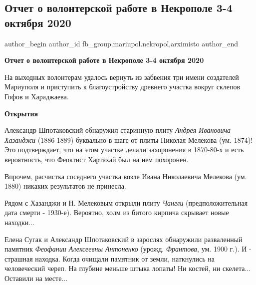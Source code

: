  
 
 
 
 

\subsection{Отчет о волонтерской работе в Некрополе 3-4 октября 2020}
\label{sec:06_10_2020.fb.fb_group.mariupol.nekropol.1.otchet_volonter_rabota_3_4_oktjabrja_2020}
 
\ifcmt
 author_begin
   author_id fb_group.mariupol.nekropol,arximisto
 author_end
\fi

\bigskip
\textbf{Отчет о волонтерской работе в Некрополе 3-4 октября 2020}

На выходных волонтерам удалось вернуть из забвения три имени создателей
Мариуполя и приступить к благоустройству древнего участка вокруг склепов Гофов
и Хараджаева.

\textbf{Открытия}

Александр Шпотаковский обнаружил старинную плиту \emph{Андрея Ивановича Хазанджи}
(1886-1889) буквально в шаге от плиты Николая Мелекова (ум. 1874)! Это
подтверждает, что на этом участке делали захоронения в 1870-80-х и есть
вероятность, что Феоктист Хартахай был на нем похоронен.

Впрочем, расчистка соседнего участка возле Ивана Николаевича Мелекова (ум.
1880) никаких результатов не принесла.

Рядом с Хазанджи и Н. Мелековым открыли плиту \emph{Чангли} (предположительная дата
смерти - 1930-е). Вероятно, холм из битого кирпича скрывает новые находки...

Елена Сугак и Александр Шпотаковский в зарослях обнаружили разваленный памятник
\emph{Феофании Алексеевны Антоненко} (урожд. \emph{Франтова}, ум. 1900 г.). И - страшная
находка. Когда очищали памятник от земли, наткнулись на человеческий череп. На
глубине меньше штыка лопаты! Ни костей, ни скелета... Оставили на месте...

